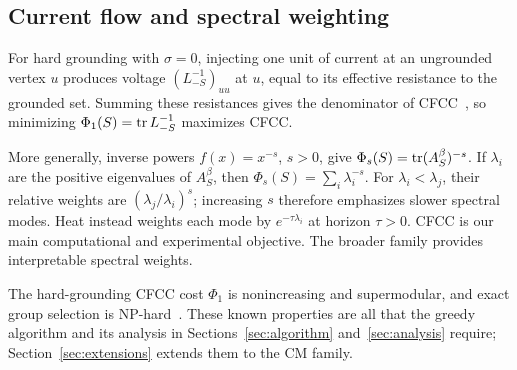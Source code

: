 \subsection{Current flow and spectral weighting}
For hard grounding with $\sigma=0$, injecting one unit of current
at an ungrounded vertex $u$ produces voltage $(L_{-S}^{-1})_{uu}$
at $u$, equal to its effective resistance to the grounded set.
Summing these resistances gives the denominator of
CFCC~\cite{li2019}, so minimizing $\Phi_1(S)=\operatorname{tr} L_{-S}^{-1}$
maximizes CFCC.

More generally, inverse powers $f(x)=x^{-s}$, $s>0$, give
$\Phi_s(S)=\operatorname{tr}(A_S^\beta)^{-s}$. If $\lambda_i$ are the
positive eigenvalues of $A_S^\beta$, then
$\Phi_s(S)=\sum_i\lambda_i^{-s}$. For $\lambda_i<\lambda_j$,
their relative weights are $(\lambda_j/\lambda_i)^s$;
increasing $s$ therefore emphasizes slower spectral modes.
Heat instead weights each mode by $e^{-\tau\lambda_i}$ at horizon
$\tau>0$. CFCC is our main computational and experimental objective.
The broader family provides interpretable spectral weights.

The hard-grounding CFCC cost $\Phi_1$ is nonincreasing and
supermodular, and exact group selection is NP-hard~\cite{li2019}.
These known properties are all that the greedy algorithm and its
analysis in Sections~\ref{sec:algorithm} and~\ref{sec:analysis}
require; Section~\ref{sec:extensions} extends them to the CM family.

